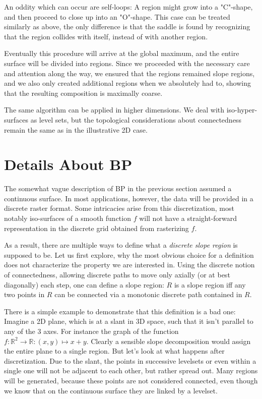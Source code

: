 \documentclass[a4paper,12pt,notitlepage,fullpage]{paper}
\theoremstyle{plain}
\theoremstyle{definition}
\begin{document}
An oddity which can occur are self-loops: A region might grow into a "C"-shape, and then proceed to close up into an "O"-shape. This case can be treated similarly as above, the only difference is that the saddle is found by recognizing that the region collides with itself, instead of with another region.

Eventually this procedure will arrive at the global maximum, and the entire surface will be divided into regions. Since we proceeded with the necessary care and attention along the way, we ensured that the regions remained slope regions, and we also only created additional regions when we absolutely had to, showing that the resulting composition is maximally coarse.

The same algorithm can be applied in higher dimensions. We deal with iso-hyper-surfaces as level sets, but the topological considerations about connectedness remain the same as in the illustrative 2D case.

\section{Details About BP}
\label{sec:details}

The somewhat vague description of BP in the previous section assumed a continuous surface. In most applications, however, the data will be provided in a discrete raster format. Some intricacies arise from this discretization, most notably iso-surfaces of a smooth function $f$ will not have a straight-forward representation in the discrete grid obtained from rasterizing $f$.

As a result, there are multiple ways to define what a \emph{discrete slope region} is supposed to be.
Let us first explore, why the most obvious choice for a definition does not characterize the property we are interested in.
Using the discrete notion of connectedness, allowing discrete paths to move only axially (or at best diagonally) each step, one can define a slope region:
$R$ is a slope region iff any two points in $R$ can be connected via a monotonic discrete path contained in $R$.

There is a simple example to demonstrate that this definition is a bad one: Imagine a 2D plane, which is at a slant in 3D space, such that it isn't parallel to any of the 3 axes. For instance the graph of the function $f: \mathbb{R}^2 \rightarrow \mathbb{R}: (x,y)\mapsto x+y$. Clearly a sensible slope decomposition would assign the entire plane to a single region.
But let's look at what happens after discretization.
Due to the slant, the points in successive levelsets or even within a single one will not be adjacent to each other, but rather spread out.
Many regions will be generated, because these points are not considered connected, even though we know that on the continuous surface they are linked by a levelset.
\end{document}
